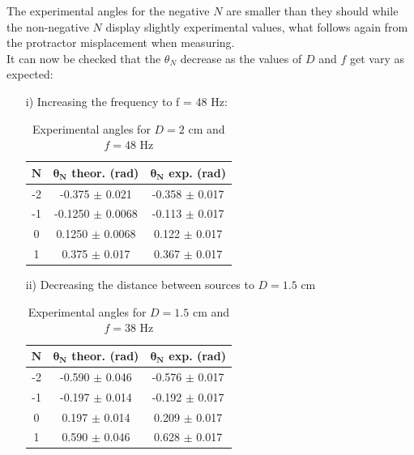 \documentclass[a4paper, 12pt]{article}
\begin{document}
	The experimental angles for the negative $N$ are smaller than they should while the non-negative $N$ display slightly experimental values, what follows again from the protractor misplacement when measuring. \\
	
	It can now be checked that the $\theta_N$ decrease as the values of $D$ and $f$ get vary as expected:
	
	\begin{itemize}
		
		\item [i)] Increasing the frequency to f = 48 Hz:
		
\begin{table}[hbt!]
	\centering
	\begin{tabular}{|c|c|c|}
		\hline
		$\boldsymbol{N}$ & $\boldsymbol{\theta_N}$ \textbf{theor. (rad)} & $\boldsymbol{\theta_N}$ \textbf{exp. (rad) } \\
		\hline
		-2 & -0.375 $\pm$ 0.021 & -0.358 $\pm$ 0.017 \\
		-1 & -0.1250 $\pm$ 0.0068& -0.113 $\pm$ 0.017 \\
		0 & 0.1250 $\pm$ 0.0068 & 0.122 $\pm$ 0.017\\
		1 & 0.375 $\pm$ 0.017&  0.367 $\pm$ 0.017\\
		\hline
	\end{tabular}
	\caption{Experimental angles for $D = 2$ cm and $f = 48$ Hz}
\end{table}

\item [ii)] Decreasing the distance between sources to $D = 1.5$ cm


	\begin{table}[H]
		\centering
		\begin{tabular}{|c|c|c|}
			\hline
			$\boldsymbol{N}$ & $\boldsymbol{\theta_N}$ \textbf{theor. (rad)} & $\boldsymbol{\theta_N}$ \textbf{exp. (rad) } \\
			\hline
			-2 & -0.590 $\pm$ 0.046 & -0.576 $\pm$ 0.017 \\
			-1 & -0.197 $\pm$ 0.014& -0.192 $\pm$ 0.017 \\
			0 & 0.197 $\pm$ 0.014 & 0.209 $\pm$ 0.017\\
			1 & 0.590 $\pm$ 0.046&  0.628 $\pm$ 0.017\\
			\hline
		\end{tabular}
		\caption{Experimental angles for $D = 1.5$ cm and $f = 38$ Hz}
	\end{table}
\end{itemize}
\end{document}
